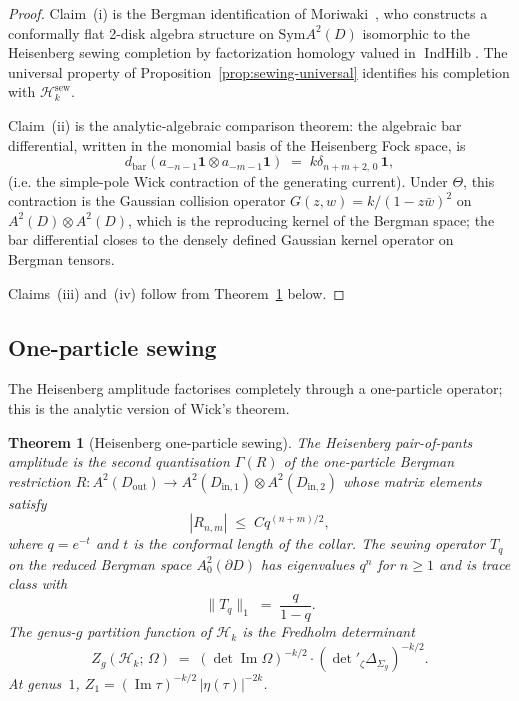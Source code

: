 \documentclass[11pt,reqno]{amsart}
\newtheorem{theorem}{Theorem}[section]
\theoremstyle{definition}
\theoremstyle{remark}
\newcommand{\cH}{\mathcal{H}}
\newcommand{\Sym}{\mathrm{Sym}}
\numberwithin{equation}{section}
\begin{document}
\begin{proof}
Claim~(i) is the Bergman identification of
Moriwaki~\cite{Moriwaki26b}, who constructs a conformally flat
2-disk algebra structure on $\Sym A^2(D)$ isomorphic to the
Heisenberg sewing completion by factorization homology valued
in $\operatorname{IndHilb}$. The universal property of
Proposition~\ref{prop:sewing-universal} identifies his
completion with $\cH_k^{\mathrm{sew}}$.

Claim~(ii) is the analytic-algebraic comparison theorem: the
algebraic bar differential, written in the monomial basis of the
Heisenberg Fock space, is
\[
d_{\mathrm{bar}}(a_{-n-1}\mathbf{1} \otimes a_{-m-1}\mathbf{1})
\;=\;
k \delta_{n+m+2,\,0}\, \mathbf{1},
\]
(i.e. the simple-pole Wick contraction of the generating current).
Under $\Theta$, this contraction is the Gaussian collision
operator
$G(z, w) = k/(1 - z\bar w)^2$ on $A^2(D) \otimes A^2(D)$,
which is the reproducing kernel of the Bergman space; the bar
differential closes to the densely defined Gaussian kernel
operator on Bergman tensors.

Claims~(iii) and~(iv) follow from
Theorem~\ref{thm:heisenberg-one-particle} below.
\end{proof}

\subsection{One-particle sewing}

The Heisenberg amplitude factorises completely through a
one-particle operator; this is the analytic version of Wick's
theorem.

\begin{theorem}[Heisenberg one-particle sewing]
\label{thm:heisenberg-one-particle}
The Heisenberg pair-of-pants amplitude is the second quantisation
$\Gamma(R)$ of the one-particle Bergman restriction
$R \colon A^2(D_{\mathrm{out}}) \to
A^2(D_{\mathrm{in},1}) \otimes A^2(D_{\mathrm{in},2})$
whose matrix elements satisfy
\[
|R_{n,m}| \;\leq\; C q^{(n+m)/2},
\]
where $q = e^{-t}$ and $t$ is the conformal length of the collar.
The sewing operator $T_q$ on the reduced Bergman space
$A^2_0(\partial D)$ has eigenvalues $q^n$ for $n \geq 1$ and is
trace class with
\[
\|T_q\|_1 \;=\; \frac{q}{1 - q}.
\]
The genus-$g$ partition function of $\cH_k$ is the Fredholm
determinant
\begin{equation}\label{eq:heisenberg-fredholm}
Z_g(\cH_k;\,\Omega)
\;=\;
(\det\operatorname{Im}\Omega)^{-k/2}
\cdot (\det{}'_\zeta \Delta_{\Sigma_g})^{-k/2}.
\end{equation}
At genus~$1$,
$Z_1 = (\operatorname{Im}\tau)^{-k/2}\,|\eta(\tau)|^{-2k}$.
\end{theorem}
\end{document}
